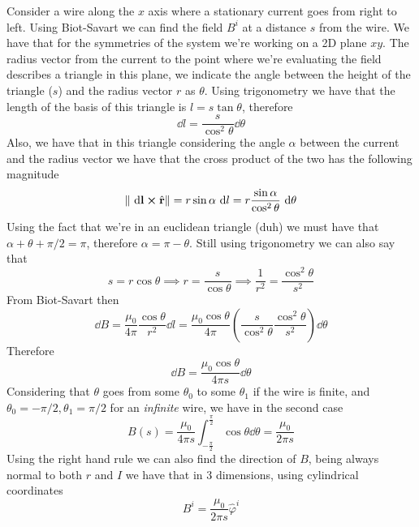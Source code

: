 \documentclass[../electromagnetism]{subfiles}
\begin{document}
\begin{eg}
	Consider a wire along the $x$ axis where a stationary current goes from right to left. Using Biot-Savart we can find the field $B^i$ at a distance $s$ from the wire.
	We have that for the symmetries of the system we're working on a 2D plane $xy$. The radius vector from the current to the point where we're evaluating the field describes a triangle in this plane, we indicate the angle between the height of the triangle ($s$) and the radius vector $r$ as $\theta$. Using trigonometry we have that the length of the basis of this triangle is $l=s\tan\theta$, therefore
	\begin{equation*}
		\dd l=\frac{s}{\cos^2\theta}\dd \theta
	\end{equation*}
	Also, we have that in this triangle considering the angle $\alpha$ between the current and the radius vector we have that the cross product of the two has the following magnitude
	\begin{equation*}
		\norm{\ \mathrm{d}\mathbf{l}\cross\hat{\mathbf{r}}}=r\sin\alpha\ \mathrm{d} l=r\frac{\sin\alpha}{\cos^2\theta}\ \mathrm{d}\theta
	\end{equation*}
	Using the fact that we're in an euclidean triangle (duh) we must have that $\alpha+\theta+\pi/2=\pi$, therefore $\alpha=\pi-\theta$. Still using trigonometry we can also say that
	\begin{equation*}
		s=r\cos\theta\implies r=\frac{s}{\cos\theta}\implies\frac{1}{r^2}=\frac{\cos^2\theta}{s^2}
	\end{equation*}
	From Biot-Savart then
	\begin{equation*}
		\dd B=\frac{\mu_0}{4\pi}\frac{\cos\theta}{r^2}\dd l=\frac{\mu_0\cos\theta}{4\pi}\left( \frac{s}{\cos^2\theta}\frac{\cos^2\theta}{s^2} \right)\dd\theta
	\end{equation*}
	Therefore
	\begin{equation}
		\dd B=\frac{\mu_0\cos\theta}{4\pi s}\dd\theta
		\label{eq:cablebfield}
	\end{equation}
	Considering that $\theta$ goes from some $\theta_0$ to some $\theta_1$ if the wire is finite, and $\theta_0=-\pi/2,\theta_1=\pi/2$ for an \emph{infinite} wire, we have in the second case
	\begin{equation}
		B(s)=\frac{\mu_0}{4\pi s}\int_{-\frac{\pi}{2}}^{\frac{\pi}{2}}\cos\theta\dd\theta=\frac{\mu_0}{2\pi s}
		\label{eq:wirebfieldcomp}
	\end{equation}
	Using the right hand rule we can also find the direction of $B$, being always normal to both $r$ and $I$ we have that in 3 dimensions, using cylindrical coordinates
	\begin{equation}
		B^i=\frac{\mu_0}{2\pi s}\hat{\varphi}^i
		\label{eq:wireBfield}
	\end{equation}
\end{eg}
\end{document}
